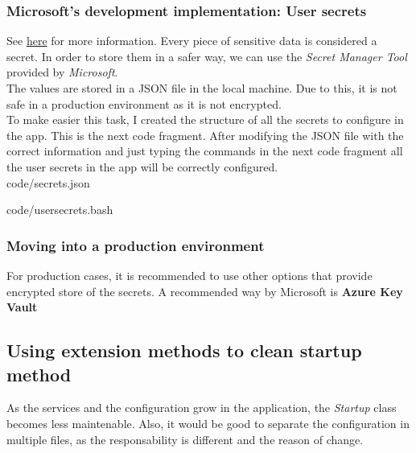         \subsubsection{Microsoft's development implementation: User secrets}
            See \href{https://docs.microsoft.com/en-us/aspnet/core/security/app-secrets?view=aspnetcore-5.0&tabs=windows}{here} for more information. Every piece of sensitive data is considered a secret. In order to store them in a safer way, we can use the \textit{Secret Manager Tool} provided by \textit{Microsoft}. \\
            The values are stored in a JSON file in the local machine. Due to this, it is not safe in a production environment as it is not encrypted. \\
            To make easier this task, I created the structure of all the secrets to configure in the app. This is the next code fragment. After modifying the JSON file with the correct information and just typing the commands in the next code fragment all the user secrets in the app will be correctly configured. \\

            
            {code/secrets.json}

            
            {code/usersecrets.bash}

        \subsubsection{Moving into a production environment}
            For production cases, it is recommended to use other options that provide encrypted store of the secrets. A recommended way by Microsoft is \textbf{Azure Key Vault} \cite{AKV}

    \subsection{Using extension methods to clean startup method}
        As the services and the configuration grow in the application, the \textit{Startup} class becomes less maintenable. Also, it would be good to separate the configuration in multiple files, as the responsability is different and the reason of change. \\
        
